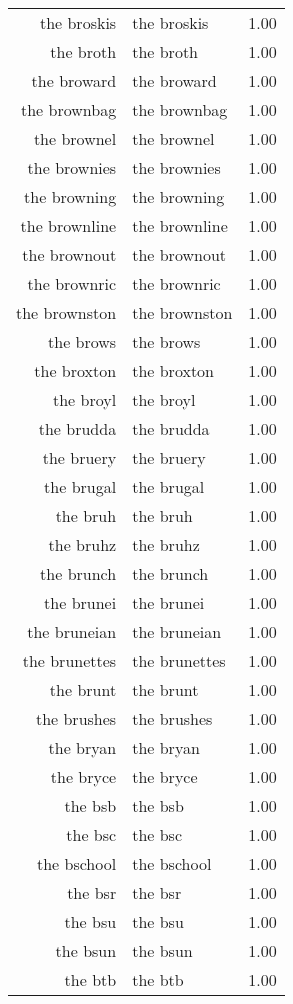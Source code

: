 \begin{table}[ht]
\begin{tabular}{rlr}
  the broskis & the broskis & 1.00 \\ 
  the broth & the broth & 1.00 \\ 
  the broward & the broward & 1.00 \\ 
  the brownbag & the brownbag & 1.00 \\ 
  the brownel & the brownel & 1.00 \\ 
  the brownies & the brownies & 1.00 \\ 
  the browning & the browning & 1.00 \\ 
  the brownline & the brownline & 1.00 \\ 
  the brownout & the brownout & 1.00 \\ 
  the brownric & the brownric & 1.00 \\ 
  the brownston & the brownston & 1.00 \\ 
  the brows & the brows & 1.00 \\ 
  the broxton & the broxton & 1.00 \\ 
  the broyl & the broyl & 1.00 \\ 
  the brudda & the brudda & 1.00 \\ 
  the bruery & the bruery & 1.00 \\ 
  the brugal & the brugal & 1.00 \\ 
  the bruh & the bruh & 1.00 \\ 
  the bruhz & the bruhz & 1.00 \\ 
  the brunch & the brunch & 1.00 \\ 
  the brunei & the brunei & 1.00 \\ 
  the bruneian & the bruneian & 1.00 \\ 
  the brunettes & the brunettes & 1.00 \\ 
  the brunt & the brunt & 1.00 \\ 
  the brushes & the brushes & 1.00 \\ 
  the bryan & the bryan & 1.00 \\ 
  the bryce & the bryce & 1.00 \\ 
  the bsb & the bsb & 1.00 \\ 
  the bsc & the bsc & 1.00 \\ 
  the bschool & the bschool & 1.00 \\ 
  the bsr & the bsr & 1.00 \\ 
  the bsu & the bsu & 1.00 \\ 
  the bsun & the bsun & 1.00 \\ 
  the btb & the btb & 1.00 \\ 

\end{tabular}
\end{table}
